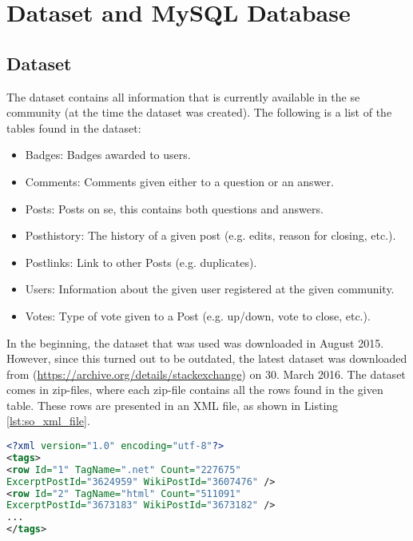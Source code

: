 \label{chap:chapter3}

\section{Dataset and MySQL Database}
\label{sec:dataset_and_db}

\subsection{Dataset}
The dataset contains all information that is currently available in the \gls{se} community (at the time the dataset was created). 
The following is a list of the tables found in the dataset:
\begin{itemize}
	\item Badges: Badges awarded to users.
	\item Comments: Comments given either to a question or an answer.
	\item Posts: Posts on \gls{se}, this contains both questions and answers.
	\item Posthistory: The history of a given post (e.g. edits, reason for closing, etc.).
	\item Postlinks: Link to other Posts (e.g. duplicates).
	\item Users: Information about the given user registered at the given community.
	\item Votes: Type of vote given to a Post (e.g. up/down, vote to close, etc.).
\end{itemize}
In the beginning, the dataset that was used was downloaded in August 2015. 
However, since this turned out to be outdated, the latest dataset was downloaded from (\url{https://archive.org/details/stackexchange}) on 30. March 2016. 
The dataset comes in zip-files, where each zip-file contains all the rows found in the given table. 
These rows are presented in an XML file, as shown in Listing \ref{lst:so_xml_file}.
\begin{lstlisting}[caption={Content in stackoverflow.com-Tags.xml}, label={lst:so_xml_file}, language={XML}] 
<?xml version="1.0" encoding="utf-8"?>
<tags>
<row Id="1" TagName=".net" Count="227675" 
ExcerptPostId="3624959" WikiPostId="3607476" />
<row Id="2" TagName="html" Count="511091" 
ExcerptPostId="3673183" WikiPostId="3673182" />
...
</tags>
\end{lstlisting}

